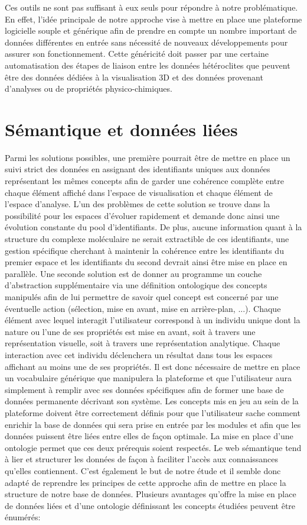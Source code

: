 Ces outils ne sont pas suffisant à eux seuls pour répondre à notre problématique. En effet, l'idée principale de notre approche vise à mettre en place une plateforme logicielle souple et générique afin de prendre en compte un nombre important de données différentes en entrée sans nécessité de nouveaux développements pour assurer son fonctionnement. Cette généricité doit passer par une certaine automatisation des étapes de liaison entre les données hétéroclites que peuvent être des données dédiées à la visualisation 3D et des données provenant d'analyses ou de propriétés physico-chimiques.


\section{Sémantique et données liées}

Parmi les solutions possibles, une première pourrait être de mettre en place un suivi strict des données en assignant des identifiants uniques aux données représentant les mêmes concepts afin de garder une cohérence complète entre chaque élément affiché dans l'espace de visualisation et chaque élément de l'espace d'analyse. L'un des problèmes de cette solution se trouve dans la possibilité pour les espaces d'évoluer rapidement et demande donc ainsi une évolution constante du pool d'identifiants. De plus, aucune information quant à la structure du complexe moléculaire ne serait extractible de ces identifiants, une gestion spécifique cherchant à maintenir la cohérence entre les identifiants du premier espace et les identifiants du second devrait ainsi être mise en place en parallèle.
Une seconde solution est de donner au programme un couche d'abstraction supplémentaire via une définition ontologique des concepts manipulés afin de lui permettre de savoir quel concept est concerné par une éventuelle action (sélection, mise en avant, mise en arrière-plan, ...). Chaque élément avec lequel interagit l'utilisateur correspond à un individu unique dont la nature ou l'une de ses propriétés est mise en avant, soit à travers une représentation visuelle, soit à travers une représentation analytique. Chaque interaction avec cet individu déclenchera un résultat dans tous les espaces affichant au moins une de ses propriétés.
Il est donc nécessaire de mettre en place un vocabulaire générique que manipulera la plateforme et que l'utilisateur aura simplement à remplir avec ses données spécifiques afin de former une base de données permanente décrivant son système. 
Les concepts mis en jeu au sein de la plateforme doivent être correctement définis pour que l'utilisateur sache comment enrichir la base de données qui sera prise en entrée par les modules et afin que les données puissent être liées entre elles de façon optimale. La mise en place d'une ontologie permet que ces deux prérequis soient respectés. Le web sémantique tend à lier et structurer les données de façon à faciliter l'accès aux connaissances qu'elles contiennent. C'est également le but de notre étude et il semble donc adapté de reprendre les principes de cette approche afin de mettre en place la structure de notre base de données. Plusieurs avantages qu'offre la mise en place de données liées et d'une ontologie définissant les concepts étudiées peuvent être énumérés:

